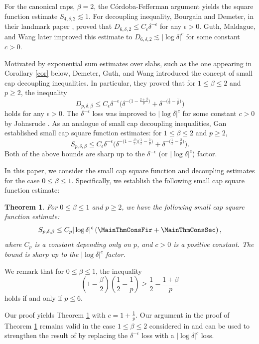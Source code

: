 \documentclass[reqno,centertags,11pt,a4paper]{amsart}
\newtheorem{theorem}[definition]{Theorem}
\begin{document}
For the canonical caps, $\beta=2$, the C\'{o}rdoba-Fefferman argument \cite{Fef, Co79} yields the square function estimate
\(S_{4,\delta,2}\lesssim1\). For decoupling inequality, Bourgain and Demeter, in their landmark paper \cite{BD15}, proved that \(D_{6,\delta,2}\leq C_\epsilon\delta^{-\epsilon}\) for any \(\epsilon>0\). Guth, Maldague, and Wang \cite{GMW24} later improved this estimate to \(D_{6,\delta,2}\lesssim |\log\delta|^c\) for some constant \(c>0\).

Motivated by exponential sum estimates over slabs, such as the one appearing in Corollary \ref{cor} below, Demeter, Guth, and Wang \cite{DGW20} introduced the concept of small cap decoupling inequalities. In particular, they proved that for \(1\leq\beta\leq2\) and \( p\geq 2\), the inequality
    \[
         D_{p,\delta,\beta}\leq C_\epsilon\delta^{-\epsilon}\bigg(\delta^{-\bigl(1-\frac{2+\beta}{p}\bigr)}+\delta^{-\bigl(\frac{1}{2}-\frac{1}{p}\bigr)}\bigg)
    \]
    holds for any \(\epsilon>0\). The \(\delta^{-\epsilon}\) loss was improved to \(|\log\delta|^c\) for some constant \(c>0\) by Johnsrude \cite{Johnsrude23}.
As an analogue of small cap decoupling inequalities, Gan \cite{Gan24} established small cap square function estimates: for \(1\leq\beta\leq2\) and \(p\geq2 \),
    \[
         S_{p,\delta,\beta}\leq C_{\epsilon} \delta^{-\epsilon}\bigg(\delta^{-\bigl(1 - \frac{\beta}{2}\bigr)\bigl(\frac{1}{2} - \frac{1}{p}\bigr)} + \delta^{-\bigl(\frac{1}{2} - \frac{2}{p}\bigr)}\bigg).
    \]
Both of the above bounds are sharp up to the \(\delta^{-\epsilon}\) (or \(|\log \delta|^{c}\)) factor.

In this paper, we consider the small cap square function and decoupling estimates for the case \(0\leq\beta\leq1\). Specifically, we establish the following small cap square function estimate:
\begin{theorem}\label{sq func esti thm}
For \(0\leq \beta\leq1\) and \(p\geq2\), we have the following small cap square function estimate:
\[
S_{p,\delta,\beta} \leq C_p|\log \delta|^{c} \left( \MainThmConsFir + \MainThmConsSec \right) ,
\]
where \(C_p\) is a constant depending only on \(p\), and \(c>0\) is a positive constant. The bound is sharp up to the \(|\log \delta|^{c}\) factor.
\end{theorem}
We remark that for \(0 \leq \beta \leq 1\), the inequality
\[
\left(1 - \frac{\beta}{2}\right)\left(\frac{1}{2} - \frac{1}{p}\right) \geq \frac{1}{2} - \frac{1+\beta}{p}
\]
holds if and only if \(p \leq 6\).

Our proof yields Theorem \ref{sq func esti thm} with $c=1+\frac{1}{p}$. Our argument in the proof of Theorem \ref{sq func esti thm} remains valid in the case \(1\leq\beta\leq2\) considered in \cite{Gan24} and can be used to strengthen the result of \cite{Gan24} by replacing the $\delta^{-\epsilon}$ loss with a $|\log \delta|^{c}$ loss.
\end{document}

